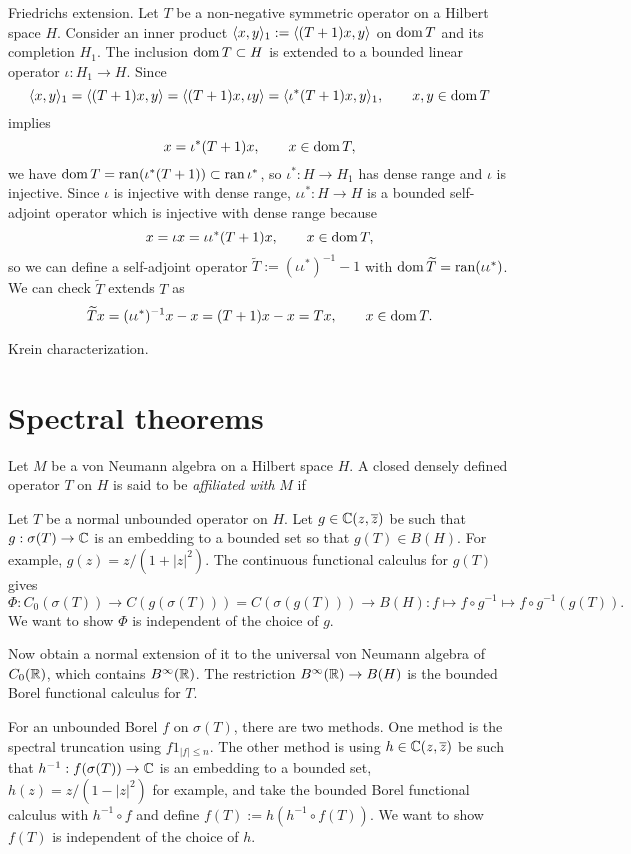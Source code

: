 \documentclass{../../large}
\begin{document}
\begin{prb}
Friedrichs extension.
Let $T$ be a non-negative symmetric operator on a Hilbert space $H$.
Consider an inner product $\langle x,y\rangle_1:=\langle(T+1)x,y\rangle$ on $\operatorname{dom} T$ and its completion $H_1$.
The inclusion $\operatorname{dom} T\subset H$ is extended to a bounded linear operator $\iota:H_1\to H$.
Since
\[\langle x,y\rangle_1=\langle(T+1)x,y\rangle=\langle(T+1)x,\iota y\rangle=\langle\iota^*(T+1)x,y\rangle_1,\qquad x,y\in\operatorname{dom} T\]
implies
\[x=\iota^*(T+1)x,\qquad x\in\operatorname{dom} T,\]
we have $\operatorname{dom} T=\operatorname{ran}(\iota^*(T+1))\subset\operatorname{ran}\iota^*$, so $\iota^*:H\to H_1$ has dense range and $\iota$ is injective.
Since $\iota$ is injective with dense range, $\iota\iota^*:H\to H$ is a bounded self-adjoint operator which is injective with dense range because
\[x=\iota x=\iota\iota^*(T+1)x,\qquad x\in\operatorname{dom} T,\] so we can define a self-adjoint operator $\tilde T:=(\iota\iota^*)^{-1}-1$ with $\operatorname{dom}\widetilde T=\operatorname{ran}(\iota\iota^*)$.
We can check $\tilde T$ extends $T$ as
\[\widetilde Tx=(\iota\iota^*)^{-1}x-x=(T+1)x-x=Tx,\qquad x\in\operatorname{dom} T.\]


Krein characterization.
\end{prb}



\section{Spectral theorems}

\begin{prb}
Let $M$ be a von Neumann algebra on a Hilbert space $H$.
A closed densely defined operator $T$ on $H$ is said to be \emph{affiliated with} $M$ if 

\end{prb}



\begin{prb}
Let $T$ be a normal unbounded operator on $H$.
Let $g\in\mathbb{C}(z,\overline z)$ be such that $g:\sigma(T)\to\mathbb{C}$ is an embedding to a bounded set so that $g(T)\in B(H)$.
For example, $g(z)=z/(1+|z|^2)$.
The continuous functional calculus for $g(T)$ gives
\[\Phi:C_0(\sigma(T))\to C(g(\sigma(T)))=C(\sigma(g(T)))\to B(H):f\mapsto f\circ g^{-1}\mapsto f\circ g^{-1}(g(T)).\]
We want to show $\Phi$ is independent of the choice of $g$.

Now obtain a normal extension of it to the universal von Neumann algebra of $C_0(\mathbb{R})$, which contains $B^\infty(\mathbb{R})$.
The restriction $B^\infty(\mathbb{R})\to B(H)$ is the bounded Borel functional calculus for $T$.

For an unbounded Borel $f$ on $\sigma(T)$, there are two methods.
One method is the spectral truncation using $f1_{|f|\le n}$.
The other method is using $h\in\mathbb{C}(z,\overline z)$ be such that $h^{-1}:f(\sigma(T))\to\mathbb{C}$ is an embedding to a bounded set, $h(z)=z/(1-|z|^2)$ for example, and take the bounded Borel functional calculus with $h^{-1}\circ f$ and define $f(T):=h(h^{-1}\circ f(T))$.
We want to show $f(T)$ is independent of the choice of $h$.
\begin{parts}
\item 
\end{parts}
\end{prb}
\end{document}
